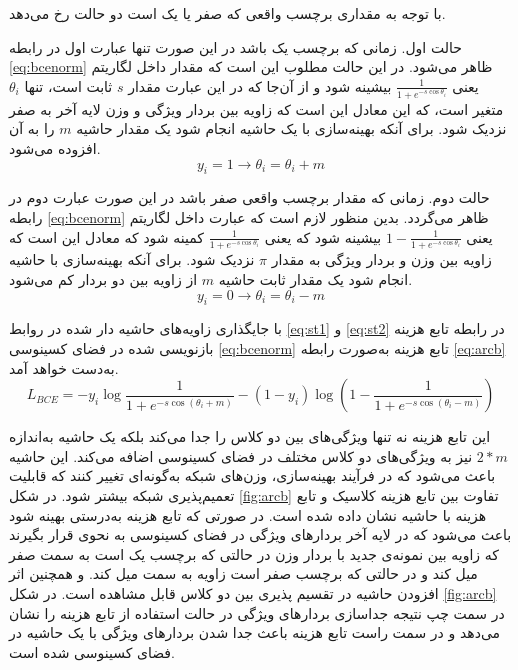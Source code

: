 با توجه به مقداری برچسب واقعی  که صفر یا یک است دو حالت رخ می‌دهد.

حالت اول. زمانی که برچسب یک باشد در این صورت تنها عبارت اول در رابطه 
\ref{eq:bcenorm}
 ظاهر می‌شود. در این حالت مطلوب این است که مقدار داخل لگاریتم یعنی 
 $\frac{1}{1+e^{-s\cos{\theta_i}}}$
 بیشینه شود و از آن‌جا که در این عبارت مقدار  
$s$
ثابت است، تنها 
$\theta_i$
متغیر است، که این معادل این است که زاویه بین بردار ویژگی و وزن لایه آخر به صفر نزدیک شود. برای آنکه بهینه‌سازی با یک حاشیه انجام شود یک مقدار حاشیه $m$ را به آن افزوده می‌شود.
  \begin{equation}\label{eq:st1}
 	y_i=1 \to \theta_i= \theta_i + m
 \end{equation}

حالت دوم. زمانی که مقدار برچسب واقعی صفر باشد در این صورت عبارت دوم در رابطه 
\ref{eq:bcenorm}
 ظاهر می‌گردد. بدین منظور لازم است که عبارت داخل لگاریتم یعنی
 $1-\frac{1}{1+e^{-s\cos{\theta_i}}}$
 بیشینه شود که یعنی  
  $\frac{1}{1+e^{-s\cos{\theta_i}}}$
 کمینه شود که معادل این است که زاویه بین وزن و بردار ویژگی به مقدار 
$\pi$
  نزدیک شود. برای آنکه بهینه‌سازی با حاشیه انجام شود یک مقدار ثابت حاشیه $m$ از زاویه بین دو بردار کم می‌شود.
   \begin{equation}\label{eq:st2}
 	y_i=0 \to \theta_i= \theta_i - m
 \end{equation}

با جایگذاری زاویه‌های حاشیه دار شده در روابط 
\ref{eq:st1}
 و 
 \ref{eq:st2}
 در رابطه تابع هزینه  بازنویسی شده در فضای کسینوسی 
 \ref{eq:bcenorm}
 تابع هزینه  به‌صورت رابطه
\ref{eq:arcb}
  به‌دست خواهد آمد.
\begin{equation}\label{eq:arcb}
	L_{BCE} = -y_i \log{\frac{1}{1+e^{-s\cos{(\theta_i+m)}}}} - (1-y_i)\log{(1-\frac{1}{1+e^{-s\cos{(\theta_i-m)}}} )}
\end{equation}

این تابع هزینه نه تنها ویژگی‌های بین دو کلاس را جدا می‌کند بلکه یک حاشیه به‌اندازه  
$2*m$
نیز به ویژگی‌های دو کلاس مختلف در فضای کسینوسی اضافه می‌کند. این حاشیه باعث می‌شود که در فرآیند بهینه‌سازی، وزن‌های شبکه به‌گونه‌ای تغییر کنند که قابلیت تعمیم‌پذیری شبکه بیشتر شود.
در شکل
\ref{fig:arcb}
تفاوت بین تابع هزینه کلاسیک و تابع هزینه با حاشیه نشان داده شده است. در صورتی که تابع هزینه به‌درستی بهینه شود باعث می‌شود که در لایه آخر بردارهای ویژگی در فضای کسینوسی به نحوی قرار بگیرند که زاویه بین نمونه‌ی جدید با بردار وزن در حالتی که برچسب یک است به سمت صفر میل کند و در حالتی که برچسب صفر است زاویه به سمت  میل کند. و همچنین اثر افزودن حاشیه در تقسیم پذیری بین دو کلاس قابل مشاهده است. در شکل
\ref{fig:arcb}
در سمت چپ نتیجه جداسازی بردارهای ویژگی در حالت استفاده از تابع هزینه  را نشان می‌دهد و در سمت راست تابع هزینه  باعث جدا شدن بردارهای ویژگی با یک حاشیه در فضای کسینوسی شده است. 
		
